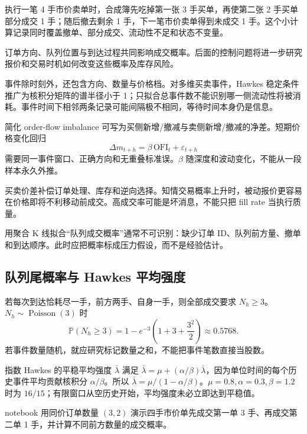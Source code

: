 

执行一笔 4 手市价卖单时，合成簿先吃掉第一张 3 手买单，再使第二张 2 手买单部分成交 1 手；随后撤去剩余 1 手，下一笔市价卖单得到未成交 1 手。这个小计算记录同时覆盖撤单、部分成交、流动性不足和状态不变量。

订单方向、队列位置与到达过程共同影响成交概率。后面的控制问题将进一步研究报价和交易时机如何改变这些概率及库存风险\cite{hawkes1971spectra,cont2001empirical}。

事件除时刻外，还包含方向、数量与价格档。对多维买卖事件，Hawkes 稳定条件推广为核积分矩阵的谱半径小于 1；只拟合总事件数不能识别哪一侧流动性将被消耗。事件时间下相邻两条记录可能间隔极不相同，等待时间本身仍是信息。


简化 order-flow imbalance 可写为买侧新增/撤减与卖侧新增/撤减的净差。短期价格变化回归
\[
\Delta m_{t+h}=\beta\,\mathrm{OFI}_t+\varepsilon_{t+h}
\]
需要同一事件窗口、正确方向和无重叠标准误。$\beta$ 随深度和波动变化，不能从一段样本永久外推。

买卖价差补偿订单处理、库存和逆向选择。知情交易概率上升时，被动报价更容易在价格即将不利移动前成交。高成交率可能是坏消息，不能只把 fill rate 当执行质量。

\begin{diagnostic}
用聚合 K 线拟合“队列成交概率”通常不可识别：缺少订单 ID、队列前方量、撤单和到达顺序。此时应把概率标成压力假设，而不是经验估计。
\end{diagnostic}
\subsection{队列尾概率与 Hawkes 平均强度}

若每次到达恰耗尽一手，前方两手、自身一手，则全部成交要求 $N_h\geq3$。$N_h\sim\operatorname{Poisson}(3)$ 时
\[
 \mathbb P(N_h\geq3)=1-e^{-3}\left(1+3+\frac{3^2}{2}\right)\approx0.5768.
\]
若事件数量随机，就应研究标记数量之和，不能把事件笔数直接当股数。

指数 Hawkes 的平稳平均强度 $\bar\lambda$ 满足 $\bar\lambda=\mu+(\alpha/\beta)\bar\lambda$，因为单位时间的每个历史事件平均贡献核积分 $\alpha/\beta$。所以 $\bar\lambda=\mu/(1-\alpha/\beta)$。$\mu=0.8,\alpha=0.3,\beta=1.2$ 时为 $16/15$；有限窗口从空历史开始，平均强度未必立即达到平稳值。

notebook 用同价订单数量 $(3,2)$ 演示四手市价单先成交第一单 3 手、再成交第二单 1 手，并计算不同前方数量的成交概率。
